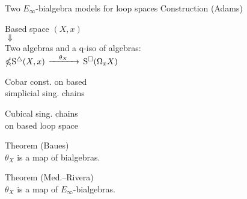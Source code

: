 %
%
%

\begin{frame}[fragile]{Two $E_\infty$-bialgebra models for loop spaces}
	\pause
	\textcolor{pblue}{Construction (Adams)}
	\vspace*{-1pt}
	\begin{center}
		Based space $(X,x)$ \\ \pause
		$\Downarrow$ \\
		Two algebras
		and a q-iso of algebras: \\
		\medskip
		$\mathbb{\Omega} \mathrm{S}^{\triangle}(X, x)$
		$\xrightarrow{\quad \theta_X \quad }$
		$\mathrm{S}^{\square}(\Omega_x X)$
	\end{center}

	\begin{minipage}{.45\textwidth}
		\begin{flushright}
			Cobar const. on based \\
			simplicial sing. chains
		\end{flushright}
	\end{minipage}
	\hspace*{.9cm}
	\begin{minipage}{.4\textwidth}
		Cubical sing. chains \\
		on based loop space
	\end{minipage}

	\bigskip\smallskip\pause
	\textcolor{pblue}{Theorem (Baues)} \\
	$\theta_X$ is a map of bialgebras.

	\bigskip\pause
	\textcolor{pblue}{Theorem (Med.--Rivera)} \\
	$\theta_X$ is a map of $E_\infty$-bialgebras.
\end{frame}

